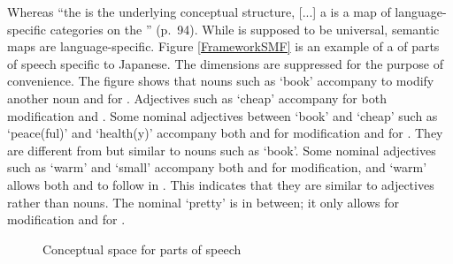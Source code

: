 Whereas
``the  is the underlying conceptual structure,
[...] a  is a map of language-specific categories on the '' (p.\ 94).
While  is supposed to be universal,
semantic maps are language-specific.
Figure \ref{FrameworkSMF} is an example of a  of parts of speech specific to Japanese.
The dimensions are suppressed for the purpose of convenience.
The figure shows that
nouns such as  `book' accompany  to modify another noun and  for . %
Adjectives such as  `cheap' accompany  for both modification and . %
Some nominal adjectives between `book' and `cheap' such as  `peace(ful)' and  `health(y)' accompany both  and  for modification and  for .
They are different from but similar to nouns such as `book'.
Some nominal adjectives such as  `warm' and  `small' accompany both  and  for modification, and
`warm' allows both  and  to follow in .
This indicates that
they are similar to adjectives rather than nouns.
The nominal   `pretty' is in between;
it only allows  for modification and  for .

\begin{figure}
 \caption{Conceptual space for parts of speech \cite[92]{croft01}}
 \label{FrameworkCSF}
\end{figure}


